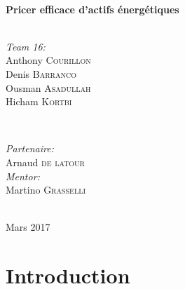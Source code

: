 \documentclass[12pt]{report}
\begin{document}
\begin{titlepage}
\center %



\HRule \\[0.4cm]
{ \huge \bfseries Pricer efficace d'actifs énergétiques}\\[0.4cm] %
\HRule \\[1.5cm]


\begin{minipage}{0.4\textwidth}
	\begin{flushleft} \large
		\emph{Team 16:}\\
		Anthony \textsc{Courillon} %
		\\
		Denis \textsc{Barranco} 
		\\
		Ousman \textsc{Asadullah} 
		\\
		Hicham \textsc{Kortbi} %
	\end{flushleft}
\end{minipage}
~
\begin{minipage}{0.4\textwidth}
	\begin{flushright} \large
		\emph{Partenaire:} \\
		Arnaud \textsc{de latour} %
		\\
		\emph{Mentor:} \\
		Martino \textsc{Grasselli} %
	\end{flushright}
\end{minipage}\\[2cm]


{\large Mars 2017}\\[2cm] %

\end{titlepage}


\chapter*{Introduction}
\end{document}
